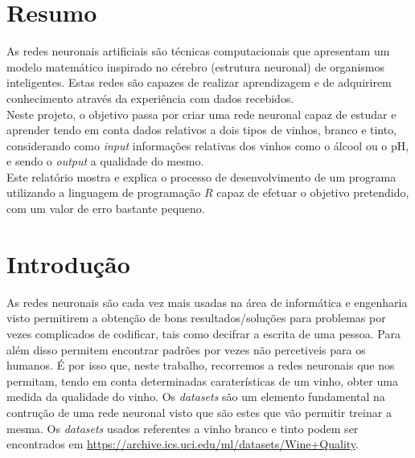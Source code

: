 \documentclass{article}
\begin{document}
\section{Resumo}
As redes neuronais artificiais são técnicas computacionais que apresentam um modelo matemático inspirado no cérebro (estrutura neuronal) de organismos inteligentes. Estas redes são capazes de realizar aprendizagem e de adquirirem conhecimento através da experiência com dados recebidos.\\
Neste projeto, o objetivo passa por criar uma rede neuronal capaz de estudar e aprender tendo em conta dados relativos a dois tipos de vinhos, branco e tinto, considerando como \textit{input} informações relativas dos vinhos como o álcool ou o pH, e sendo o \textit{output} a qualidade do mesmo.\\
Este relatório mostra e explica o processo de desenvolvimento de um programa utilizando a linguagem de programação $R$ capaz de efetuar o objetivo pretendido, com um valor de erro bastante pequeno.  

\vspace*{\fill}

\newpage

\vspace*{\fill}
\tableofcontents
\vspace*{\fill}

\newpage

\vspace*{\fill}
\section{Introdução}
As redes neuronais são cada vez mais usadas na área de informática e engenharia visto permitirem a obtenção de bons resultados/soluções para problemas por vezes complicados de codificar, tais como decifrar a escrita de uma pessoa. Para além disso permitem encontrar padrões por vezes não percetiveis para os humanos. É por isso que, neste trabalho, recorremos a redes neuronais que nos permitam, tendo em conta determinadas caraterísticas de um vinho, obter uma medida da qualidade do vinho. Os \textit{datasets} são um elemento fundamental na contrução de uma rede neuronal visto que são estes que vão permitir treinar a mesma. Os \textit{datasets} usados referentes a vinho branco e tinto podem ser encontrados em \url{https://archive.ics.uci.edu/ml/datasets/Wine+Quality}.
\vspace*{\fill}

\newpage
\end{document}
